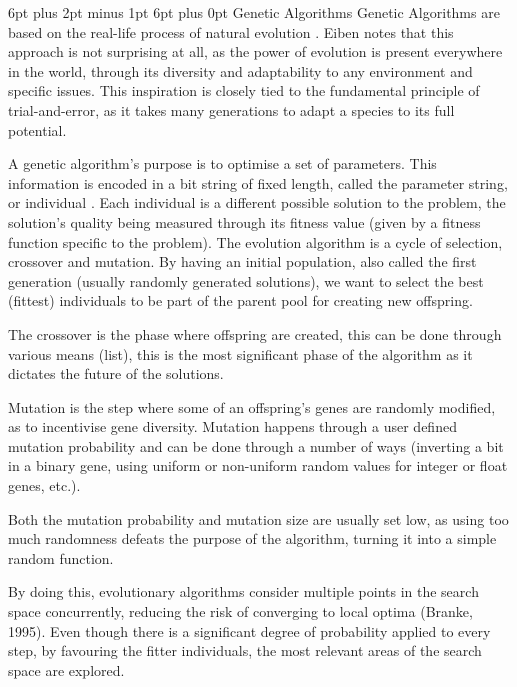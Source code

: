 \documentclass[12pt,a4paper]{article}
\makeatletter
\renewcommand\subsection{\@startsection {subsection}{1}{2mm} %
                               {6pt plus 2pt minus 1pt} %
                               {6pt plus 0pt} %
                               {\normalfont\bfseries}}
\makeatother
\begin{document}
	\subsection{Genetic Algorithms}
Genetic Algorithms are based on the real-life process of natural evolution \cite{agoston_e._eiben_introduction_2015}. Eiben notes that this approach is not surprising at all, as the power of evolution is present everywhere in the world, through its diversity and adaptability to any environment and specific issues. This inspiration is closely tied to the fundamental principle of trial-and-error, as it takes many generations to adapt a species to its full potential.\par
A genetic algorithm’s purpose is to optimise a set of parameters. This information is encoded in a bit string of fixed length, called the parameter string, or individual \cite{goldberg_genetic_1988}. Each individual is a different possible solution to the problem, the solution’s quality being measured through its fitness value (given by a fitness function specific to the problem). The evolution algorithm is a cycle of selection, crossover and mutation. By having an initial population, also called the first generation (usually randomly generated solutions), we want to select the best (fittest) individuals to be part of the parent pool for creating new offspring.\par
The crossover is the phase where offspring are created, this can be done through various means (list), this is the most significant phase of the algorithm as it dictates the future of the solutions.\par
Mutation is the step where some of an offspring’s genes are randomly modified, as to incentivise gene diversity. Mutation happens through a user defined mutation probability and can be done through a number of ways (inverting a bit in a binary gene, using uniform or non-uniform random values for integer or float genes, etc.).\par
Both the mutation probability and mutation size are usually set low, as using too much randomness defeats the purpose of the algorithm, turning it into a simple random function.\par
By doing this, evolutionary algorithms consider multiple points in the search space concurrently, reducing the risk of converging to local optima (Branke, 1995). Even though there is a significant degree of probability applied to every step, by favouring the fitter individuals, the most relevant areas of the search space are explored.\par
\end{document}
